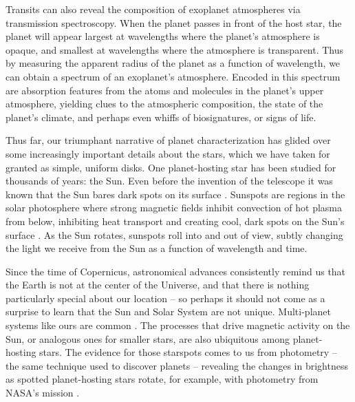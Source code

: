 Transits can also reveal the composition of exoplanet atmospheres via transmission spectroscopy. When the planet passes in front of the host star, the planet will appear largest at wavelengths where the planet's atmosphere is opaque, and smallest at wavelengths where the atmosphere is transparent. Thus by measuring the apparent radius of the planet as a function of wavelength, we can obtain a spectrum of an exoplanet's atmosphere. Encoded in this spectrum are absorption features from the atoms and molecules in the planet's upper atmosphere, yielding clues to the atmospheric composition, the state of the planet's climate, and perhaps even whiffs of biosignatures, or signs of life.

Thus far, our triumphant narrative of planet characterization has glided over some increasingly important details about the stars, which we have taken for granted as simple, uniform disks. One planet-hosting star has been studied for thousands of years: the Sun. Even before the invention of the telescope it was known that the Sun bares dark spots on its surface \citep{Hayakawa2017}. Sunspots are regions in the solar photosphere where strong magnetic fields inhibit convection of hot plasma from below, inhibiting heat transport and creating cool, dark spots on the Sun's surface \citep{Solanki2003}. As the Sun rotates, sunspots roll into and out of view, subtly changing the light we receive from the Sun as a function of wavelength and time.

Since the time of Copernicus, astronomical advances consistently remind us that the Earth is not at the center of the Universe, and that there is nothing particularly special about our location \citep{Copernicus1543} -- so perhaps it should not come as a surprise to learn that the Sun and Solar System are not unique. Multi-planet systems like ours are common \citep{Dressing2013,Burke2015,Coughlin2016}. The processes that drive magnetic activity on the Sun, or analogous ones for smaller stars, are also ubiquitous among planet-hosting stars. The evidence for those starspots comes to us from photometry -- the same technique used to discover planets -- revealing the changes in brightness as spotted planet-hosting stars rotate, for example, with photometry from NASA's \kepler mission \citep{Walkowicz2013,McQuillan2013,Giles2017}.  

